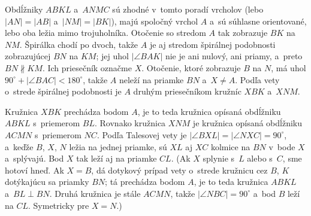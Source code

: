 %
{
    Obdĺžniky $ABKL$ a~$ANMC$ sú zhodné v~tomto poradí vrcholov (lebo $|AN| = |AB|$ a~$|NM| = |BK|$), majú spoločný vrchol $A$ a~sú súhlasne orientované, lebo oba ležia mimo trojuholníka. Otočenie so stredom $A$ tak zobrazuje $BK$ na $NM$. Špirálka chodí po dvoch, takže $A$ je aj stredom špirálnej podobnosti zobrazujúcej $BN$ na $KM$; jej uhol $|\angle BAK|$ nie je ani nulový, ani priamy, a~preto $BN \nparallel KM$. Ich priesečník označme $X$. Otočenie, ktoré zobrazuje $B$ na $N$, má uhol $90^\circ + |\angle BAC| < 180^\circ$, takže $A$ neleží na priamke $BN$ a~$X \neq A$. Podľa vety o~strede špirálnej podobnosti je $A$ druhým priesečníkom kružníc $XBK$ a~$XNM$.


    Kružnica $XBK$ prechádza bodom $A$, je to teda kružnica opísaná obdĺžniku $ABKL$ s~priemerom $BL$. Rovnako kružnica $XNM$ je kružnica opísaná obdĺžniku $ACMN$ s~priemerom $NC$. Podľa Talesovej vety je $|\angle BXL| = |\angle NXC| = 90^\circ$, a~keďže $B$, $X$, $N$ ležia na jednej priamke, sú $XL$ aj $XC$ kolmice na $BN$ v~bode $X$ a~splývajú. Bod $X$ tak leží aj na priamke $CL$. (Ak $X$ splynie s~$L$ alebo s~$C$, sme hotoví hneď. Ak $X = B$, dá dotykový prípad vety o~strede kružnicu cez $B$, $K$ dotýkajúcu sa priamky $BN$; tá prechádza bodom $A$, je to teda kružnica $ABKL$ a~$BL \perp BN$. Druhá kružnica je stále $ACMN$, takže $|\angle NBC| = 90^\circ$ a~bod $B$ leží na $CL$. Symetricky pre $X = N$.)
}

